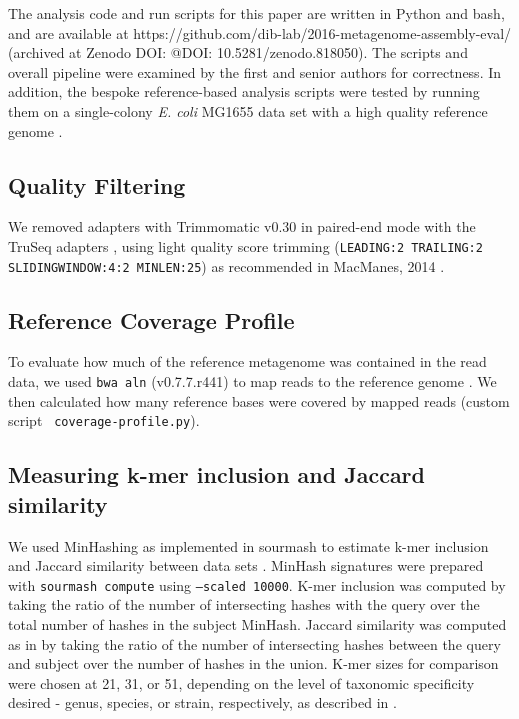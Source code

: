 \documentclass[11pt]{article}
\begin{document}
The analysis code and run scripts for this paper are written in Python
and bash, and are available at
https://github.com/dib-lab/2016-metagenome-assembly-eval/ (archived at
Zenodo DOI: @DOI: 10.5281/zenodo.818050). The scripts and overall
pipeline were examined by the first and senior authors for
correctness.  In addition, the bespoke reference-based analysis
scripts were tested by running them on a single-colony {\em E. coli}
MG1655 data set with a high quality reference genome
\cite{chitsaz2011}.

\subsection*{Quality Filtering} 

We removed adapters with Trimmomatic v0.30 in paired-end mode with the
TruSeq adapters \cite{trimmomatic}, using light quality score trimming
({\tt LEADING:2 TRAILING:2 SLIDINGWINDOW:4:2 MINLEN:25})
as recommended in MacManes, 2014 \cite{macmanes2014optimal}.

\subsection*{Reference Coverage Profile}

To evaluate how much of the reference metagenome was contained in the
read data, we used {\tt bwa aln} (v0.7.7.r441) to map reads to the
reference genome \cite{bwa}.  We then calculated how many reference
bases were covered by mapped reads (custom script {\tt
  coverage-profile.py}).


\subsection*{Measuring k-mer inclusion and Jaccard similarity}

We used MinHashing as implemented in sourmash to estimate k-mer
inclusion and Jaccard similarity between data sets \cite{sourmash}.
MinHash signatures were prepared with {\tt sourmash compute} using
{\tt --scaled 10000}.  K-mer inclusion was computed by taking the ratio of
the number of intersecting hashes with the query over the total number
of hashes in the subject MinHash. Jaccard similarity was computed as
in \cite{mash} by taking the ratio of the number of intersecting
hashes between the query and subject over the number of hashes in the
union.  K-mer sizes for comparison were chosen at 21, 31, or 51,
depending on the level of taxonomic specificity desired - genus,
species, or strain, respectively, as described in \cite{metapalette}.
\end{document}
